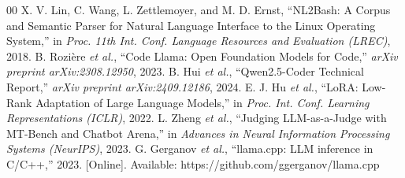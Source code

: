 \documentclass[conference]{IEEEtran}
\begin{document}
\begin{thebibliography}{00}
 X. V. Lin, C. Wang, L. Zettlemoyer, and M. D. Ernst,
``NL2Bash: A Corpus and Semantic Parser for Natural Language Interface to the
Linux Operating System,'' in \emph{Proc. 11th Int. Conf. Language Resources and
Evaluation (LREC)}, 2018.
 B. Rozi\`ere \emph{et al.}, ``Code Llama: Open
Foundation Models for Code,'' \emph{arXiv preprint arXiv:2308.12950}, 2023.
 B. Hui \emph{et al.}, ``Qwen2.5-Coder Technical
Report,'' \emph{arXiv preprint arXiv:2409.12186}, 2024.
 E. J. Hu \emph{et al.}, ``LoRA: Low-Rank Adaptation of Large
Language Models,'' in \emph{Proc. Int. Conf. Learning Representations (ICLR)},
2022.
 L. Zheng \emph{et al.}, ``Judging LLM-as-a-Judge with
MT-Bench and Chatbot Arena,'' in \emph{Advances in Neural Information Processing
Systems (NeurIPS)}, 2023.
 G. Gerganov \emph{et al.}, ``llama.cpp: LLM inference in
C/C++,'' 2023. [Online]. Available: https://github.com/ggerganov/llama.cpp
\end{thebibliography}
\end{document}

